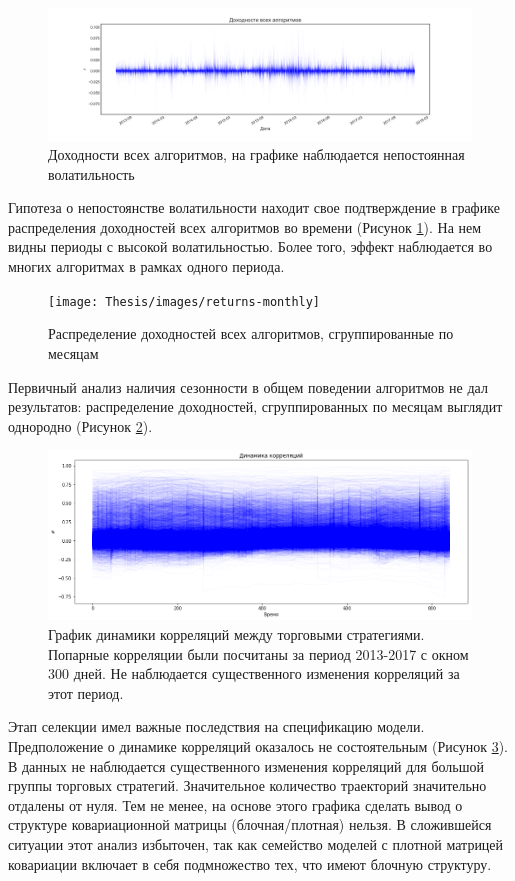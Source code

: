 \begin{figure}[h]
	\centering
	\includegraphics[width=\linewidth]{Thesis/images/returns-all}
	\caption{Доходности всех алгоритмов, на графике наблюдается непостоянная волатильность}
	\label{fig:allreturns}
\end{figure}

Гипотеза о непостоянстве волатильности находит свое подтверждение в графике распределения доходностей всех алгоритмов во времени (Рисунок \ref{fig:allreturns}). На нем видны периоды с высокой волатильностью. Более того, эффект наблюдается во многих алгоритмах в рамках одного периода.	

\begin{figure}
	\centering
	\texttt{[image: Thesis/images/returns-monthly]}
	\caption{Распределение доходностей всех алгоритмов, сгруппированные по месяцам}
	\label{fig:monthlyreturns}
\end{figure}

Первичный анализ наличия сезонности в общем поведении алгоритмов не дал результатов: распределение доходностей, сгруппированных по месяцам выглядит однородно (Рисунок \ref{fig:monthlyreturns}).

\begin{figure}[h]
	\centering
	\includegraphics[width=\linewidth]{Thesis/images/correlations}
	\caption{График динамики корреляций между торговыми стратегиями. Попарные корреляции были посчитаны за период 2013-2017 с окном 300 дней. Не наблюдается существенного изменения корреляций за этот период.}
	\label{fig:correlations}
\end{figure}
Этап селекции имел важные последствия на спецификацию модели. Предположение о динамике корреляций оказалось не состоятельным (Рисунок \ref{fig:correlations}). В данных не наблюдается существенного изменения корреляций для большой группы торговых стратегий. Значительное количество траекторий значительно отдалены от нуля. Тем не менее, на основе этого графика сделать вывод о структуре ковариационной матрицы (блочная/плотная) нельзя. В сложившейся ситуации этот анализ избыточен, так как семейство моделей с плотной матрицей ковариации включает в себя подмножество тех, что имеют блочную структуру. 


